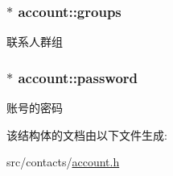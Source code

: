 \subsubsection[{\texorpdfstring{groups}{groups}}]{$\ast$ account\+::groups}\hypertarget{structaccount_a957e1ae193761d02468d729a7ee842a2}{}\label{structaccount_a957e1ae193761d02468d729a7ee842a2}
联系人群组 
\subsubsection[{\texorpdfstring{password}{password}}]{$\ast$ account\+::password}\hypertarget{structaccount_a3e45fe694a28895f58b011f410f3f57f}{}\label{structaccount_a3e45fe694a28895f58b011f410f3f57f}
账号的密码 

该结构体的文档由以下文件生成\+:\begin{DoxyCompactItemize}
\item 
src/contacts/\hyperlink{account_8h}{account.\+h}\end{DoxyCompactItemize}
